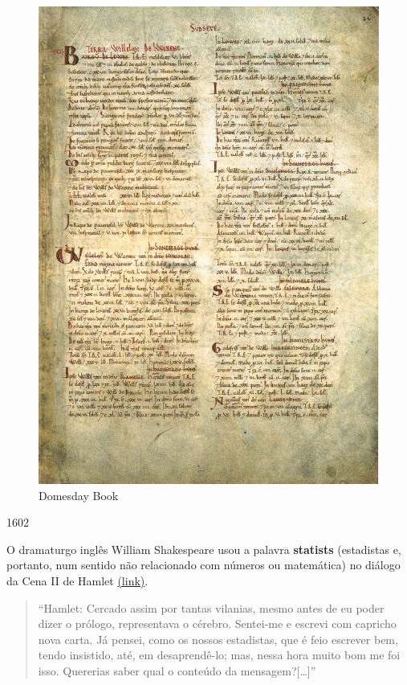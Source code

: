\documentclass[
]{book}
\begin{document}
\begin{figure}

{\centering \includegraphics[width=0.75\linewidth]{images1/domesday} 

}

\caption{Domesday Book}\label{fig:figA1}
\end{figure}

\hfill\break

1602

\hfill\break

O dramaturgo inglês William Shakespeare usou a palavra \textbf{statists} (estadistas e, portanto, num sentido não relacionado com números ou matemática) no diálogo da Cena II de Hamlet \href{http://shakespeare.mit.edu/hamlet/full.html}{(link)}.

\hfill\break

\begin{quote}
``Hamlet:
Cercado assim por tantas vilanias, mesmo antes de eu poder dizer o prólogo, representava o cérebro.
Sentei-me e escrevi com capricho nova carta. Já pensei, como os nossos estadistas, que é feio escrever bem, tendo insistido, até, em desaprendê-lo; mas, nessa hora muito bom me foi isso. Quererias saber
qual o conteúdo da mensagem?{[}\ldots{]}''
\end{quote}
\end{document}
